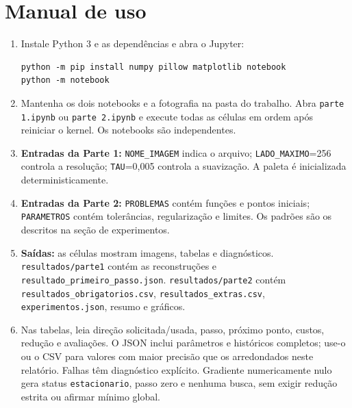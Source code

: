 \documentclass[12pt,a4paper]{article}
\begin{document}
\section{Manual de uso}
\begin{enumerate}
\item Instale Python 3 e as dependências e abra o Jupyter:
\begin{verbatim}
python -m pip install numpy pillow matplotlib notebook
python -m notebook
\end{verbatim}
\item Mantenha os dois notebooks e a fotografia na pasta do trabalho.
Abra \texttt{parte 1.ipynb} ou \texttt{parte 2.ipynb} e execute todas as
células em ordem após reiniciar o kernel. Os notebooks são independentes.
\item \textbf{Entradas da Parte 1:} \texttt{NOME\_IMAGEM} indica o arquivo;
\texttt{LADO\_MAXIMO}=256 controla a resolução; \texttt{TAU}=0,005
controla a suavização. A paleta é inicializada deterministicamente.
\item \textbf{Entradas da Parte 2:} \texttt{PROBLEMAS} contém funções e
pontos iniciais; \texttt{PARAMETROS} contém tolerâncias, regularização e
limites. Os padrões são os descritos na seção de experimentos.
\item \textbf{Saídas:} as células mostram imagens, tabelas e diagnósticos.
\texttt{resultados/parte1} contém as reconstruções e
\texttt{resultado\_primeiro\_passo.json}.
\texttt{resultados/parte2} contém
\texttt{resultados\_obrigatorios.csv}, \texttt{resultados\_extras.csv},
\texttt{experimentos.json}, resumo e gráficos.
\item Nas tabelas, leia direção solicitada/usada, passo, próximo ponto,
custos, redução e avaliações. O JSON inclui parâmetros e históricos
completos; use-o ou o CSV para valores com maior precisão que os arredondados
neste relatório. Falhas têm diagnóstico explícito. Gradiente numericamente
nulo gera status \texttt{estacionario}, passo zero e nenhuma busca, sem
exigir redução estrita ou afirmar mínimo global.
\end{enumerate}
\end{document}
